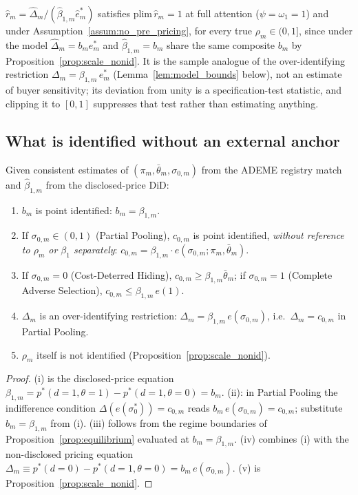 \begin{corollary}
\label{cor:ratio_specification_test}
$\hat r_m=\hat\Delta_m/(\hat\beta_{1,m}\hat e^*_m)$ satisfies $\mathrm{plim}\,\hat r_m=1$
at full attention ($\psi=\omega_1=1$) and under Assumption~\ref{assum:no_pre_pricing}, for every true $\rho_m\in(0,1]$, since under the model $\hat\Delta_m=b_m e^*_m$ and
$\hat\beta_{1,m}=b_m$ share the same composite $b_m$ by
Proposition~\ref{prop:scale_nonid}. It is the sample analogue of the over-identifying
restriction $\Delta_m=\beta_{1,m}\,e^*_m$ (Lemma~\ref{lem:model_bounds} below), not an
estimate of buyer sensitivity; its deviation from unity is a specification-test statistic, and
clipping it to $[0,1]$ suppresses that test rather than estimating anything.
\end{corollary}

\subsection*{What is identified without an external anchor}

\begin{proposition}
\label{prop:what_identified}
Given consistent estimates of $(\pi_m,\bar\theta_m,\sigma_{0,m})$ from the ADEME registry match
and $\hat\beta_{1,m}$ from the disclosed-price DiD:
\begin{enumerate}[label=(\roman*)]
    \item $b_m$ is point identified: $b_m=\beta_{1,m}$.
    \item If $\sigma_{0,m}\in(0,1)$ (Partial Pooling), $c_{0,m}$ is point identified,
        \emph{without reference to $\rho_m$ or $\beta_1$ separately}:
        $c_{0,m}=\beta_{1,m}\cdot e(\sigma_{0,m};\pi_m,\bar\theta_m)$.
    \item If $\sigma_{0,m}=0$ (Cost-Deterred Hiding), $c_{0,m}\ge\beta_{1,m}\bar\theta_m$; if
        $\sigma_{0,m}=1$ (Complete Adverse Selection), $c_{0,m}\le\beta_{1,m}\,e(1)$.
    \item $\Delta_m$ is an over-identifying restriction: $\Delta_m=\beta_{1,m}\,e(\sigma_{0,m})$,
        i.e.\ $\Delta_m=c_{0,m}$ in Partial Pooling.
    \item $\rho_m$ itself is not identified (Proposition~\ref{prop:scale_nonid}).
\end{enumerate}
\end{proposition}

\begin{proof}
(i) is the disclosed-price equation $\beta_{1,m}=p^*(d=1,\theta=1)-p^*(d=1,\theta=0)=b_m$.
(ii): in Partial Pooling the indifference condition
$\Delta(e(\sigma_0^*))=c_{0,m}$ reads $b_m\,e(\sigma_{0,m})=c_{0,m}$; substitute $b_m=\beta_{1,m}$
from (i). (iii) follows from the regime boundaries of Proposition~\ref{prop:equilibrium}
evaluated at $b_m=\beta_{1,m}$. (iv) combines (i) with the non-disclosed pricing equation
$\Delta_m\equiv p^*(d=0)-p^*(d=1,\theta=0)=b_m\,e(\sigma_{0,m})$. (v) is
Proposition~\ref{prop:scale_nonid}.
\end{proof}

